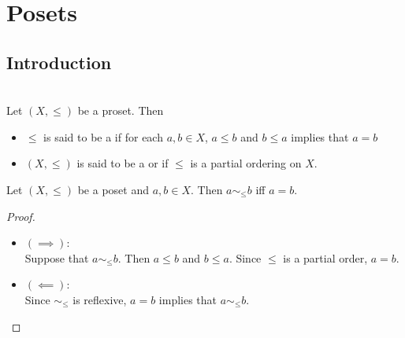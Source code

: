 \documentclass{book}
\begin{document}
	
	
	
	
	
	
	
	
	
	
	
	
	
	
	
	
	
	
	
	
	
	
	
	
	
	
	
	
	
	
	
	
	
	
	
	\newpage
	\chapter{Posets}
	
	\section{Introduction}
	
	\begin{defn}   \\
		Let $(X, \leq)$ be a proset. Then 
		\begin{itemize}
			\item $\leq$ is said to be a  if for each $a,b \in X$, $a \leq b$ and $b \leq a$ implies that $a = b$
			\item $(X, \leq)$ is said to be a  or  if
			$\leq$ is a partial ordering on $X$.
		\end{itemize}
	\end{defn}
	
	\begin{ex} 
		Let $(X, \leq)$ be a poset and $a,b \in X$. Then $a \sim_{\leq} b$ iff $a = b$. 
	\end{ex}
	
	\begin{proof}\
		\begin{itemize}
			\item $(\implies)$: \\
			Suppose that $a \sim_{\leq} b$. Then $a \leq b$ and $b \leq a$. Since $\leq$ is a partial order, $a = b$. 
			\item $(\impliedby)$: \\
			Since $\sim_{\leq}$ is reflexive, $a = b$ implies that $a \sim_{\leq} b$. 
		\end{itemize}
	\end{proof}
	
\end{document}
